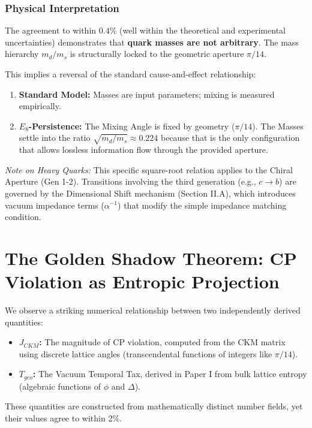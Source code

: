 \subsubsection{Physical Interpretation}
The agreement to within $0.4\%$ (well within the theoretical and experimental uncertainties) demonstrates that \textbf{quark masses are not arbitrary}. The mass hierarchy $m_d/m_s$ is structurally locked to the geometric aperture $\pi/14$.

This implies a reversal of the standard cause-and-effect relationship:
\begin{enumerate}
    \item \textbf{Standard Model:} Masses are input parameters; mixing is measured empirically.
    \item \textbf{$E_8$-Persistence:} The Mixing Angle is fixed by geometry ($\pi/14$). The Masses settle into the ratio $\sqrt{m_d/m_s} \approx 0.224$ because that is the only configuration that allows lossless information flow through the provided aperture.
\end{enumerate}

\textit{Note on Heavy Quarks:} This specific square-root relation applies to the Chiral Aperture (Gen 1-2). Transitions involving the third generation (e.g., $c \to b$) are governed by the Dimensional Shift mechanism (Section II.A), which introduces vacuum impedance terms ($\alpha^{-1}$) that modify the simple impedance matching condition.





\section{The Golden Shadow Theorem: CP Violation as Entropic Projection}

We observe a striking numerical relationship between two independently derived quantities:
\begin{itemize}
    \item \textbf{$J_{CKM}$:} The magnitude of CP violation, computed from the CKM matrix using discrete lattice angles (transcendental functions of integers like $\pi/14$).
    \item \textbf{$T_{geo}$:} The Vacuum Temporal Tax, derived in Paper I from bulk lattice entropy (algebraic functions of $\phi$ and $\Delta$).
\end{itemize}
These quantities are constructed from mathematically distinct number fields, yet their values agree to within 2\%.

